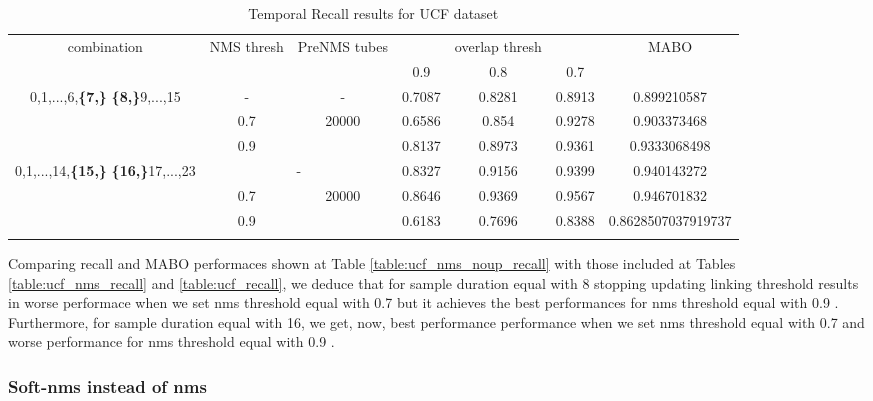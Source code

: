 \documentclass{report}
\begin{document}
\begin{center}
  \setlength{\tabcolsep}{2.2pt}
\begin{longtable}{||c | c | c | c c c| c|}

  \hline
  \multirow{2}{*}{combination} & \multirow{2}{2.5em}{NMS thresh} & \multirow{2}{3.5em}{PreNMS tubes} &  {} &overlap thresh & {} & \multirow{2}{*}{MABO} \\
  {} & {} & {} &  0.9 &  0.8 & 0.7 & {}\\         
  \hline

  \multirow{3}{7em}{0,1,...,6,\textbf{\{7,\}}
    \textbf{\{8,\}}9,...,15 }  &   -   & -    & 0.7087 & 0.8281 & 0.8913 & 0.899210587 \\
  \cline{2-7} 
  {} & 0.7 &\multirow{2}{*}{20000}  & 0.6586 & 0.854 & 0.9278 & 0.903373468 \\
  \cline{2-2} \cline{4-7} 
  {} &  0.9   & {}   &  0.8137 & 0.8973 & 0.9361 & 0.9333068498 \\
  \hline                                    
  \multirow{3}{7em}{0,1,...,14,\textbf{\{15,\}}
  \textbf{\{16,\}}17,...,23 }  &   \multicolumn{2}{|c|}{-} & 0.8327 & 0.9156 &0.9399 & 0.940143272 \\
  \cline{2-7}
  {} & 0.7 & \multirow{2}{*}{20000}& 0.8646 & 0.9369 & 0.9567 & 0.946701832 \\
  \cline{2-2} \cline{4-7} 
  {} &  0.9   & {}   & 0.6183 & 0.7696 & 0.8388 & 0.8628507037919737 \\
  \hline                                    

  \caption{Temporal Recall results for UCF dataset}
  \label{table:ucf_nms_noup_temp_recall}
\end{longtable} 
\end{center}

Comparing recall and MABO performaces shown at Table \ref{table:ucf_nms_noup_recall} with those included at Tables \ref{table:ucf_nms_recall}
and \ref{table:ucf_recall}, we deduce that for sample duration equal with 8 stopping updating linking threshold results in worse performace
when we set nms threshold equal with 0.7 but it achieves the best performances for nms threshold equal with 0.9 . Furthermore, for sample duration
equal with 16, we get, now,  best performance performance when we set nms threshold equal with 0.7 and worse performance for nms threshold equal with 0.9 .

\subsubsection{Soft-nms instead of nms}
\end{document}
